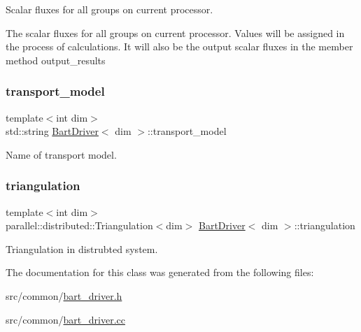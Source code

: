 Scalar fluxes for all groups on current processor. 

The scalar fluxes for all groups on current processor. Values will be assigned in the process of calculations. It will also be the output scalar fluxes in the member method output\+\_\+results \mbox{\label{class_bart_driver_a736f40f99459dc715fdb174e06626f55}} 
\subsubsection{\texorpdfstring{transport\+\_\+model}{transport\_model}}
{\footnotesize\ttfamily template$<$int dim$>$ \\
std\+::string \hyperlink{class_bart_driver}{Bart\+Driver}$<$ dim $>$\+::transport\+\_\+model\hspace{0.3cm}{\ttfamily [private]}}



Name of transport model. 

\mbox{\label{class_bart_driver_a8bdcafa21b042017d1e871ed07ae3a81}} 
\subsubsection{\texorpdfstring{triangulation}{triangulation}}
{\footnotesize\ttfamily template$<$int dim$>$ \\
parallel\+::distributed\+::\+Triangulation$<$dim$>$ \hyperlink{class_bart_driver}{Bart\+Driver}$<$ dim $>$\+::triangulation\hspace{0.3cm}{\ttfamily [private]}}



Triangulation in distrubted system. 



The documentation for this class was generated from the following files\+:\begin{DoxyCompactItemize}
\item 
src/common/\hyperlink{bart__driver_8h}{bart\+\_\+driver.\+h}\item 
src/common/\hyperlink{bart__driver_8cc}{bart\+\_\+driver.\+cc}\end{DoxyCompactItemize}
